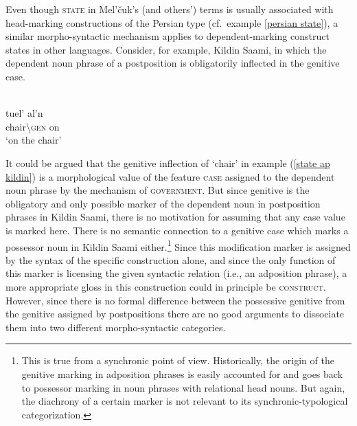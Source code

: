 Even though \textsc{state} in Mel'čuk's (and others') terms is usually associated with head-marking constructions of the Persian type (cf.~example \ref{persian state}), a similar morpho-syntactic mechanism applies to dependent\hyp{}marking construct states in other languages. Consider, for example, Kildin Saami, in which the dependent noun phrase of a postposition is obligatorily inflected in the genitive case.
\begin{exe}
\ex
{}\\
\label{state ap kildin}
\gll 	tuel'		al'n\\
	chair\textbackslash\textsc{gen}	on\\
\glt 	‘on the chair’
\end{exe}

It could be argued that the genitive inflection of ‘chair’ in example (\ref{state ap kildin}) is a morphological value of the feature \textsc{case} assigned to the dependent noun phrase by the mechanism of \textsc{government}. But since genitive is the obligatory and only possible marker of the dependent noun in postposition phrases in Kildin Saami, there is no motivation for assuming that any case value is marked here. There is no semantic connection to a genitive case which marks a possessor noun in Kildin Saami either.\footnote{This is true from a synchronic point of view. Historically, the origin of the genitive marking in adposition phrases is easily accounted for and goes back to possessor marking in noun phrases with relational head nouns. But again, the diachrony of a certain marker is not relevant to its synchronic-typological categorization.} Since this modification marker is assigned by the syntax of the specific construction alone, and since the only function of this marker is licensing the given syntactic relation (i.e., an adposition phrase), a more appropriate gloss in this construction could in principle be \textsc{construct}. However, since there is no formal difference between the possessive genitive from the genitive assigned by postpositions there are no good arguments to dissociate them into two different morpho-syntactic categories.

